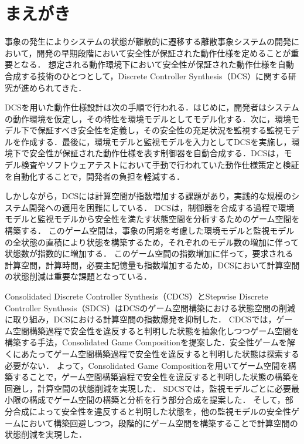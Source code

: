 \section{まえがき}
\label{section:introduction}
事象の発生によりシステムの状態が離散的に遷移する離散事象システムの開発において，開発の早期段階において安全性が保証された動作仕様を定めることが重要となる．
想定される動作環境下において安全性が保証された動作仕様を自動合成する技術のひとつとして，Discrete Controller Synthesis（DCS）\cite{paper:SupervisoryControl}に関する研究が進められてきた．

DCSを用いた動作仕様設計は次の手順で行われる．はじめに，開発者はシステムの動作環境を仮定し，その特性を環境モデルとしてモデル化する．次に，環境モデル下で保証すべき安全性を定義し，その安全性の充足状況を監視する監視モデルを作成する．最後に，環境モデルと監視モデルを入力としてDCSを実施し，環境下で安全性が保証された動作仕様を表す制御器を自動合成する．DCSは，モデル検査やソフトウェアテストにおいて手動で行われていた動作仕様策定と検証を自動化することで，開発者の負担を軽減する．

しかしながら，DCSには計算空間が指数増加する課題があり，実践的な規模のシステム開発への適用を困難にしている．
DCSは，制御器を合成する過程で環境モデルと監視モデルから安全性を満たす状態空間を分析するためのゲーム空間を構築する．
このゲーム空間は，事象の同期を考慮した環境モデルと監視モデルの全状態の直積により状態を構築するため，それぞれのモデル数の増加に伴って状態数が指数的に増加する．
このゲーム空間の指数増加に伴って，要求される計算空間，計算時間，必要主記憶量も指数増加するため，DCSにおいて計算空間の状態削減は重要な課題となっている．

Consolidated Discrete Controller Synthesis（CDCS）\cite{yamauchi:IPSJ2024}とStepwise Discrete Controller Synthesis（SDCS）\cite{yamauchi:IEICEJ2023}はDCSのゲーム空間構築における状態空間の削減に取り組み，DCSにおける計算空間の指数爆発を抑制した．
CDCS\cite{yamauchi:IPSJ2024}では，ゲーム空間構築過程で安全性を違反すると判明した状態を抽象化しつつゲーム空間を構築する手法，Consolidated Game Compositionを提案した．安全性ゲームを解くにあたってゲーム空間構築過程で安全性を違反すると判明した状態は探索する必要がない．
よって，Consolidated Game Compositionを用いてゲーム空間を構築することで，ゲーム空間構築過程で安全性を違反すると判明した状態の構築を回避し，計算空間の状態削減を実現した．
SDCS\cite{yamauchi:IEICEJ2023}では，監視モデルごとに必要最小限の構成でゲーム空間の構築と分析を行う部分合成を提案した．
そして，部分合成によって安全性を違反すると判明した状態を，他の監視モデルの安全性ゲームにおいて構築回避しつつ，段階的にゲーム空間を構築することで計算空間の状態削減を実現した．

